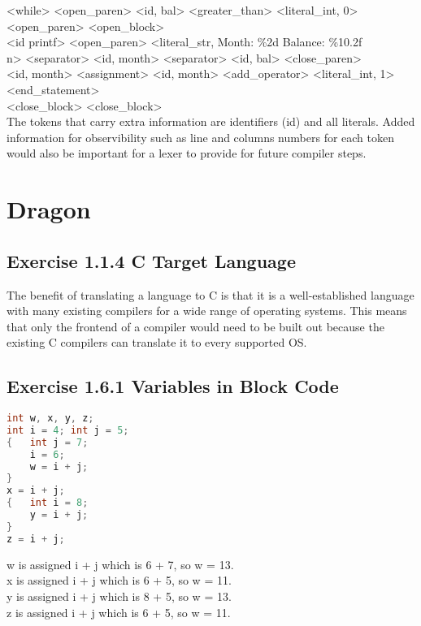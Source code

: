 \documentclass[letterpaper, 10pt]{article}
\begin{document}
\textless while\textgreater
\textless open\_paren\textgreater
\textless id, bal\textgreater
\textless greater\_than\textgreater
\textless literal\_int, 0\textgreater
\textless open\_paren\textgreater
\textless open\_block\textgreater\\

\textless id printf\textgreater
\textless open\_paren\textgreater
\textless literal\_str, Month: \%2d Balance: \%10.2f\\n\textgreater
\textless separator\textgreater
\textless id, month\textgreater
\textless separator\textgreater
\textless id, bal\textgreater
\textless close\_paren\textgreater\\

\textless id, month\textgreater
\textless assignment\textgreater
\textless id, month\textgreater
\textless add\_operator\textgreater
\textless literal\_int, 1\textgreater
\textless end\_statement\textgreater\\

\textless close\_block\textgreater
\textless close\_block\textgreater\\
The tokens that carry extra information are identifiers (id) and all literals.
Added information for observibility such as line and columns numbers for each
   token would also be important for a lexer to provide for future compiler steps.

\section{Dragon}
\subsection{Exercise 1.1.4 C Target Language}
The benefit of translating a language to C is that it is a well-established
   language with many existing compilers for a wide range of operating systems.
This means that only the frontend of a compiler would need to be built out because
   the existing C compilers can translate it to every supported OS.
\newpage
\subsection{Exercise 1.6.1 Variables in Block Code}
\begin{lstlisting}[language=C]
int w, x, y, z;
int i = 4; int j = 5;
{   int j = 7;
    i = 6;
    w = i + j;
}
x = i + j;
{   int i = 8;
    y = i + j;
}
z = i + j;
\end{lstlisting}
w is assigned i + j which is 6 + 7, so w = 13.\\
x is assigned i + j which is 6 + 5, so w = 11.\\
y is assigned i + j which is 8 + 5, so w = 13.\\
z is assigned i + j which is 6 + 5, so w = 11.\\
\end{document}
